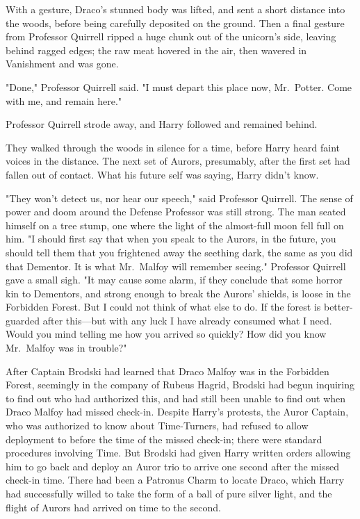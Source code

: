 With a gesture, Draco's stunned body was lifted, and sent a short distance into 
the woods, before being carefully deposited on the ground. Then a final gesture 
from Professor Quirrell ripped a huge chunk out of the unicorn's side, leaving 
behind ragged edges; the raw meat hovered in the air, then wavered in 
Vanishment and was gone.

"Done," Professor Quirrell said. "I must depart this place now, Mr.~Potter. 
Come with me, and remain here."

Professor Quirrell strode away, and Harry followed and remained behind.

They walked through the woods in silence for a time, before Harry heard faint 
voices in the distance. The next set of Aurors, presumably, after the first set 
had fallen out of contact. What his future self was saying, Harry didn't know.

"They won't detect us, nor hear our speech," said Professor Quirrell. The sense 
of power and doom around the Defense Professor was still strong. The man seated 
himself on a tree stump, one where the light of the almost-full moon fell full 
on him. "I should first say that when you speak to the Aurors, in the future, 
you should tell them that you frightened away the seething dark, the same as 
you did that Dementor. It is what Mr.~Malfoy will remember seeing." Professor 
Quirrell gave a small sigh. "It may cause some alarm, if they conclude that 
some horror kin to Dementors, and strong enough to break the Aurors' shields, 
is loose in the Forbidden Forest. But I could not think of what else to do. If 
the forest is better-guarded after this---but with any luck I have already 
consumed what I need. Would you mind telling me how you arrived so quickly? How 
did you know Mr.~Malfoy was in trouble?"

After Captain Brodski had learned that Draco Malfoy was in the Forbidden 
Forest, seemingly in the company of Rubeus Hagrid, Brodski had begun inquiring 
to find out who had authorized this, and had still been unable to find out when 
Draco Malfoy had missed check-in. Despite Harry's protests, the Auror Captain, 
who was authorized to know about Time-Turners, had refused to allow deployment 
to before the time of the missed check-in; there were standard procedures 
involving Time. But Brodski had given Harry written orders allowing him to go 
back and deploy an Auror trio to arrive one second after the missed check-in 
time. There had been a Patronus Charm to locate Draco, which Harry had 
successfully willed to take the form of a ball of pure silver light, and the 
flight of Aurors had arrived on time to the second.

